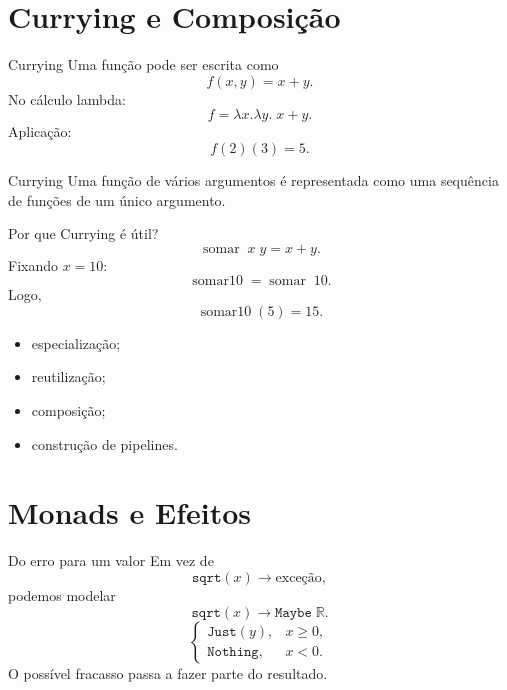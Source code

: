 \documentclass[aspectratio=169,11pt]{beamer}
\begin{document}
\section{Currying e Composição}

\begin{frame}{Currying}
    Uma função pode ser escrita como
    \[
        f(x,y)=x+y.
    \]
    No cálculo lambda:
    \[
        f=\lambda x.\lambda y.\;x+y.
    \]
    Aplicação:
    \[
        f(2)(3)=5.
    \]
    \begin{block}{Currying}
        Uma função de vários argumentos é representada como uma sequência de funções de um único argumento.
    \end{block}
\end{frame}

\begin{frame}{Por que Currying é útil?}
    \[
        \operatorname{somar}\;x\;y=x+y.
    \]
    Fixando $x=10$:
    \[
        \operatorname{somar10}=\operatorname{somar}\;10.
    \]
    Logo,
    \[
        \operatorname{somar10}(5)=15.
    \]
    \begin{itemize}
        \item especialização;
        \item reutilização;
        \item composição;
        \item construção de pipelines.
    \end{itemize}
\end{frame}

\section{Monads e Efeitos}

\begin{frame}{Do erro para um valor}
    Em vez de
    \[
        \texttt{sqrt}(x)\rightarrow\text{exceção},
    \]
    podemos modelar
    \[
        \texttt{sqrt}(x)\rightarrow\texttt{Maybe}\;\mathbb{R}.
    \]
    \[
        \begin{cases}
            \texttt{Just}(y), & x\geq0, \\
            \texttt{Nothing}, & x<0.
        \end{cases}
    \]
    O possível fracasso passa a fazer parte do resultado.
\end{frame}
\end{document}
